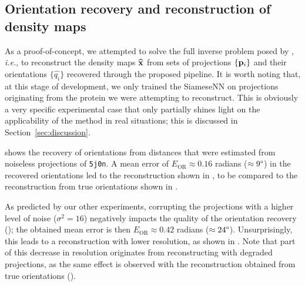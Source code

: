 
\subsection{Orientation recovery and reconstruction of density maps}\label{sec:results:orientation-recovery:reconstruction}


As a proof-of-concept, we attempted to solve the full inverse problem posed by , \textit{i.e.}, to reconstruct the density maps $\widehat{\mathbf{x}}$ from sets of projections $\{ \mathbf{p}_i \}$ and their orientations $\{ \widehat{q_i} \}$ recovered through the proposed pipeline.
It is worth noting that, at this stage of development, we only trained the SiameseNN on projections originating from the protein we were attempting to reconstruct. This is obviously a very specific experimental case that only partially shines light on the applicability of the method in real situations; this is discussed in Section~\ref{sec:discussion}.

 shows the recovery of orientations from distances that were estimated from noiseless projections of \texttt{5j0n}.
A mean error of $E_\text{OR} \approx 0.16$ radians ($\approx 9\degree$) in the recovered orientations led to the reconstruction shown in , to be compared to the reconstruction from true orientations shown in .

As predicted by our other experiments, corrupting the projections with a higher level of noise ($\sigma^2=16$) negatively impacts the quality of the orientation recovery (); the obtained mean error is then $E_\text{OR} \approx 0.42$ radians ($\approx 24\degree$).
Unsurprisingly, this leads to a reconstruction with lower resolution, as shown in .
Note that part of this decrease in resolution originates from reconstructing with degraded projections, as the same effect is observed with the reconstruction obtained from true orientations ().


